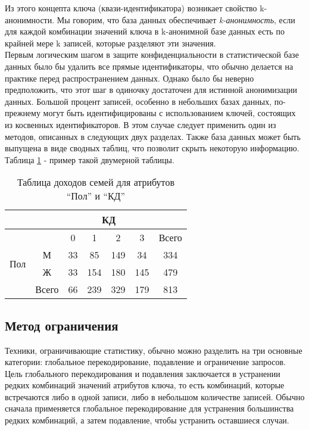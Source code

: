 Из этого концепта ключа (квази-идентификатора) возникает свойство k-анонимности. Мы говорим, что база данных обеспечивает \textit{k-анонимность}, если для каждой комбинации значений ключа в k-анонимной базе данных есть по крайней мере k записей, которые разделяют эти значения.
\\

Первым логическим шагом в защите конфиденциальности в статистической базе данных было бы удалить все прямые идентификаторы, что обычно делается на практике перед распространением данных. Однако было бы неверно предположить, что этот шаг в одиночку достаточен для истинной анонимизации данных. Большой процент записей, особенно в небольших базах данных, по-прежнему могут быть идентифицированы с использованием ключей, состоящих из косвенных идентификаторов. В этом случае следует применить один из методов, описанных в следующих двух разделах. Также база данных может быть выпущена в виде сводных таблиц, что позволит скрыть некоторую информацию. Таблица \ref{tab:summain} - пример такой двумерной таблицы. 

\begin{table}[h]
\centering
\begin{tabular}{|c|cccccc|}
\hline
                        & \multicolumn{6}{c|}{КД}                                                                                                         \\ \hline
\multirow{4}{*}{Пол} & \multicolumn{1}{c|}{}      & \multicolumn{1}{c|}{0}  & \multicolumn{1}{c|}{1}   & \multicolumn{1}{c|}{2}   & \multicolumn{1}{c|}{3}   & Всего \\ \cline{2-7} 
                        & \multicolumn{1}{c|}{М}     & \multicolumn{1}{c|}{33} & \multicolumn{1}{c|}{85}  & \multicolumn{1}{c|}{149} & \multicolumn{1}{c|}{34}  & 334   \\ \cline{2-7} 
                        & \multicolumn{1}{c|}{Ж}     & \multicolumn{1}{c|}{33} & \multicolumn{1}{c|}{154} & \multicolumn{1}{c|}{180} & \multicolumn{1}{c|}{145} & 479   \\ \cline{2-7} 
                       & \multicolumn{1}{c|}{Всего} & \multicolumn{1}{c|}{66} & \multicolumn{1}{c|}{239} & \multicolumn{1}{c|}{329} & \multicolumn{1}{c|}{179} & 813   \\ \hline
\end{tabular}
\caption{Таблица доходов семей для атрибутов \enquote{Пол} и \enquote{КД}}
\label{tab:summain}
\end{table}

\subsection{Метод ограничения}
Техники, ограничивающие статистику, обычно можно разделить на три основные категории: глобальное перекодирование, подавление и ограничение запросов. Цель глобального перекодирования и подавления заключается в устранении редких комбинаций значений атрибутов ключа, то есть комбинаций, которые встречаются либо в одной записи, либо в небольшом количестве записей. Обычно сначала применяется глобальное перекодирование для устранения большинства редких комбинаций, а затем подавление, чтобы устранить оставшиеся случаи.
\\

